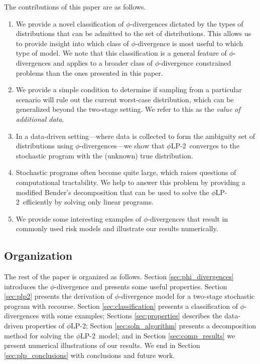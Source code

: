 \documentclass[opre,nonblindrev]{informs3} %
\newcommand{\plp}{$\phi$LP-2}
\begin{document}
\bigskip


The contributions of this paper are as follows. 
\begin{enumerate}
	\item 
		We provide a novel classification of $\phi$-divergences dictated by the types of distributions that can be admitted to the set of distributions. 
		This allows us to provide insight into which class of $\phi$-divergence is most useful to which type of model.
		We note that this classification is a general feature of $\phi$-divergences and applies to a broader class of $\phi$-divergence constrained problems than the ones presented in this paper. 
		
	\item 
		We provide a simple condition to determine if sampling from a particular scenario will rule out the current worst-case distribution, which can be generalized beyond the two-stage setting.
		We refer to this as the {\it value of additional data}. 
		

\item 
		In a data-driven setting---where data is collected to form the ambiguity set of distributions using $\phi$-divergences---we show that \plp\ converges to the stochastic program with the (unknown) true distribution.
		

	\item Stochastic programs often become quite large, which raises questions of computational tractability.
		We help to answer this problem by providing a modified Bender's decomposition that can be used to solve the \plp\ efficiently by solving only linear programs. 

	\item We provide some interesting examples of $\phi$-divergences that result in commonly used risk models and illustrate our results numerically. 
\end{enumerate}

\subsection{Organization}

The rest of the paper is organized as follows.
Section \ref{sec:phi_divergences} introduces the $\phi$-divergence and presents some useful properties.
Section \ref{sec:plp2} presents the derivation of $\phi$-divergence model for a two-stage stochastic program with recourse.
Section \ref{sec:classification} presents a classification of $\phi$-divergences with some examples;
Sections \ref{sec:properties} describes the data-driven properties of \plp; 
Section \ref{sec:soln_algorithm} presents a decomposition method for solving the \plp\ model; and in Section \ref{sec:comp_results} we present numerical illustrations of our results. 
We end in Section \ref{sec:plp_conclusions} with conclusions and future work.
\end{document}
